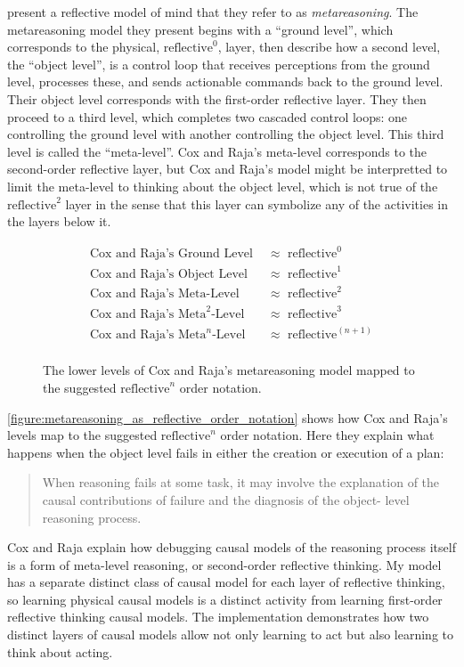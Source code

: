 \cite{cox_and_raja:2008} present a reflective model of mind that they
refer to as \emph{metareasoning}.  The metareasoning model they
present begins with a ``ground level'', which corresponds to the
physical, $\text{reflective}^0$, layer, then describe how a second
level, the ``object level'', is a control loop that receives
perceptions from the ground level, processes these, and sends
actionable commands back to the ground level.  Their object level
corresponds with the first-order reflective layer.  They then proceed
to a third level, which completes two cascaded control loops: one
controlling the ground level with another controlling the object
level.  This third level is called the ``meta-level''.  Cox and Raja's
meta-level corresponds to the second-order reflective layer, but Cox
and Raja's model might be interpretted to limit the meta-level to
thinking about the object level, which is not true of the
$\text{reflective}^2$ layer in the sense that this layer can symbolize
any of the activities in the layers below it.
\begin{figure}[bth]
\begin{align*}
\text{Cox and Raja's Ground Level } &{\approx} \text{ reflective}^0 \\
\text{Cox and Raja's Object Level } &{\approx} \text{ reflective}^1 \\
\text{Cox and Raja's Meta-Level }   &{\approx} \text{ reflective}^2 \\
\text{Cox and Raja's $\text{Meta}^2$-Level } &{\approx} \text{ reflective}^3 \\
\text{Cox and Raja's $\text{Meta}^n$-Level } &{\approx} \text{ reflective}^{(n+1)} \\
\end{align*}
\caption{The lower levels of Cox and Raja's metareasoning model mapped
  to the suggested $\text{reflective}^n$ order notation.}
\label{figure:metareasoning_as_reflective_order_notation}
\end{figure}
\autoref{figure:metareasoning_as_reflective_order_notation} shows how
Cox and Raja's levels map to the suggested $\text{reflective}^n$ order
notation.  Here they explain what happens when the object level fails
in either the creation or execution of a plan:
\begin{quote}
When reasoning fails at some task, it may involve the explanation of
the causal contributions of failure and the diagnosis of the object-
level reasoning process.
\end{quote}
Cox and Raja explain how debugging causal models of the reasoning
process itself is a form of meta-level reasoning, or second-order
reflective thinking.  My model has a separate distinct class of causal
model for each layer of reflective thinking, so learning physical
causal models is a distinct activity from learning first-order
reflective thinking causal models.  The implementation demonstrates
how two distinct layers of causal models allow not only learning to
act but also learning to think about acting.

